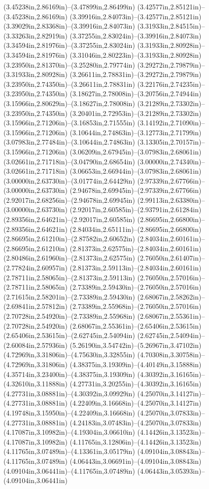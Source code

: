 (3.45238in,2.86169in)--(3.47899in,2.86499in) (3.42577in,2.85121in)--(3.45238in,2.86169in) (3.39916in,2.84073in)--(3.42577in,2.85121in) (3.39029in,2.83368in)--(3.39916in,2.84073in) (3.31933in,2.84515in)--(3.33263in,2.82919in) (3.37255in,2.83024in)--(3.39916in,2.84073in) (3.34594in,2.81976in)--(3.37255in,2.83024in) (3.31933in,2.80928in)--(3.34594in,2.81976in) (3.31046in,2.80223in)--(3.31933in,2.80928in) (3.23950in,2.81370in)--(3.25280in,2.79774in) (3.29272in,2.79879in)--(3.31933in,2.80928in) (3.26611in,2.78831in)--(3.29272in,2.79879in) (3.23950in,2.74350in)--(3.26611in,2.78831in) (3.22176in,2.74235in)--(3.23950in,2.74350in) (3.18627in,2.78008in)--(3.20756in,2.74944in) (3.15966in,2.80629in)--(3.18627in,2.78008in) (3.21289in,2.73302in)--(3.23950in,2.74350in) (3.20401in,2.72953in)--(3.21289in,2.73302in) (3.15966in,2.71206in)--(3.16853in,2.71555in) (3.14192in,2.71090in)--(3.15966in,2.71206in) (3.10644in,2.74863in)--(3.12773in,2.71799in) (3.07983in,2.77484in)--(3.10644in,2.74863in) (3.13305in,2.70157in)--(3.15966in,2.71206in) (3.06209in,2.67945in)--(3.07983in,2.68061in) (3.02661in,2.71718in)--(3.04790in,2.68654in) (3.00000in,2.74340in)--(3.02661in,2.71718in) (3.06653in,2.66944in)--(3.07983in,2.68061in) (3.00000in,2.63730in)--(3.01774in,2.64429in) (2.97339in,2.67766in)--(3.00000in,2.63730in) (2.94678in,2.69945in)--(2.97339in,2.67766in) (2.92017in,2.68256in)--(2.94678in,2.69945in) (2.99113in,2.63380in)--(3.00000in,2.63730in) (2.92017in,2.60585in)--(2.93791in,2.61284in) (2.89356in,2.64621in)--(2.92017in,2.60585in) (2.86695in,2.66800in)--(2.89356in,2.64621in) (2.84034in,2.65111in)--(2.86695in,2.66800in) (2.86695in,2.61210in)--(2.87582in,2.60652in) (2.84034in,2.60161in)--(2.86695in,2.61210in) (2.81373in,2.62575in)--(2.84034in,2.60161in) (2.80486in,2.61960in)--(2.81373in,2.62575in) (2.76050in,2.61407in)--(2.77824in,2.60957in) (2.81373in,2.59113in)--(2.84034in,2.60161in) (2.78711in,2.58065in)--(2.81373in,2.59113in) (2.76050in,2.57016in)--(2.78711in,2.58065in) (2.73389in,2.59430in)--(2.76050in,2.57016in) (2.71615in,2.58201in)--(2.73389in,2.59430in) (2.68067in,2.58262in)--(2.69841in,2.57812in) (2.73389in,2.55968in)--(2.76050in,2.57016in) (2.70728in,2.54920in)--(2.73389in,2.55968in) (2.68067in,2.55361in)--(2.70728in,2.54920in) (2.68067in,2.55361in)--(2.65406in,2.53615in) (2.65406in,2.53615in)--(2.62745in,2.54094in) (2.62745in,2.54094in)--(2.60084in,2.57936in) (5.26190in,3.54742in)--(5.26967in,3.47102in) (4.72969in,3.31806in)--(4.75630in,3.32855in) (4.70308in,3.30758in)--(4.72969in,3.31806in) (4.38375in,3.19309in)--(4.40149in,3.15888in) (4.35714in,3.23400in)--(4.38375in,3.19309in) (4.30392in,3.16165in)--(4.32610in,3.11888in) (4.27731in,3.20255in)--(4.30392in,3.16165in) (4.27731in,3.08881in)--(4.30392in,3.09929in) (4.25070in,3.14127in)--(4.27731in,3.08881in) (4.22409in,3.16668in)--(4.25070in,3.14127in) (4.19748in,3.15950in)--(4.22409in,3.16668in) (4.25070in,3.07833in)--(4.27731in,3.08881in) (4.24183in,3.07483in)--(4.25070in,3.07833in) (4.17087in,3.10982in)--(4.19304in,3.06610in) (4.14426in,3.13523in)--(4.17087in,3.10982in) (4.11765in,3.12806in)--(4.14426in,3.13523in) (4.11765in,3.07489in)--(4.13361in,3.05179in) (4.09104in,3.08843in)--(4.11765in,3.07489in) (4.06443in,3.06691in)--(4.09104in,3.08843in) (4.09104in,3.06441in)--(4.11765in,3.07489in) (4.06443in,3.05393in)--(4.09104in,3.06441in) 